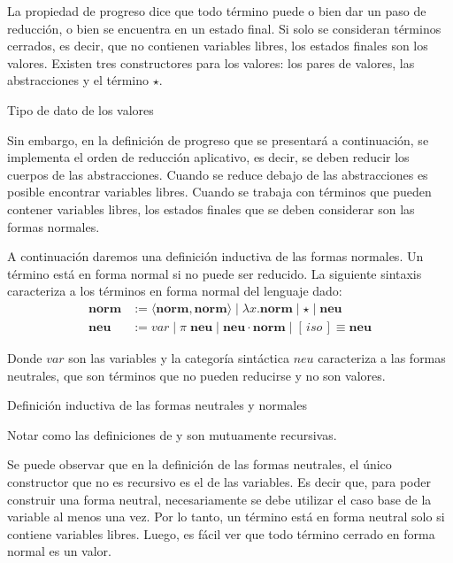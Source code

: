 La propiedad de progreso dice que todo término puede o bien dar un paso de reducción, o bien se encuentra en un estado final.
Si solo se consideran términos cerrados, es decir, que no contienen variables libres, los estados finales son los valores.
Existen tres constructores para los valores: los pares de valores, las abstracciones y el término $\star$.

\begin{codigo}
	Tipo de dato de los valores
\end{codigo}

Sin embargo, en la definición de progreso que se presentará a continuación, se implementa el orden de reducción aplicativo, es decir, se deben reducir los cuerpos de las abstracciones.
Cuando se reduce debajo de las abstracciones es posible encontrar variables libres.
Cuando se trabaja con términos que pueden contener variables libres, los estados finales que se deben considerar son las formas normales.

A continuación daremos una definición inductiva de las formas normales. Un término está en forma normal si no puede ser reducido. La siguiente sintaxis caracteriza a los términos en forma normal del lenguaje dado: 
\begin{align*}
	\textbf{norm} &:= \langle \textbf{norm}, \textbf{norm} \rangle \mid \lambda x. \textbf{norm} \mid \star \mid \textbf{neu} \\
	\textbf{neu} &:= var \mid \pi\; \textbf{neu} \mid \textbf{neu} \cdot \textbf{norm} \mid [\, iso \,]\!\!\equiv \textbf{neu}
\end{align*}

Donde $var$ son las variables y la categoría sintáctica $neu$ caracteriza a las formas neutrales, que son términos que no pueden reducirse y no son valores.

\begin{codigo}
	Definición inductiva de las formas neutrales y normales
	 \\
\end{codigo}

Notar como las definiciones de \type{$\Uparrow$} y \type{$\Downarrow$} son mutuamente recursivas.

Se puede observar que en la definición de las formas neutrales, el único constructor que no es recursivo es el de las variables.
Es decir que, para poder construir una forma neutral, necesariamente se debe utilizar el caso base de la variable al menos una vez.
Por lo tanto, un término está en forma neutral solo si contiene variables libres.
Luego, es fácil ver que todo término cerrado en forma normal es un valor.

